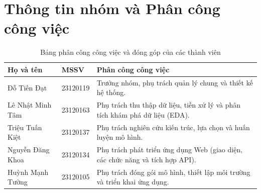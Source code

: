 \section*{Thông tin nhóm và Phân công công việc}

\begin{table}[H]
\centering
\begin{tabularx}{\textwidth}{llX}
\toprule
\textbf{Họ và tên} & \textbf{MSSV} & \textbf{Phân công công việc} \\ \midrule
Đỗ Tiến Đạt & 23120119 & Trưởng nhóm, phụ trách quản lý chung và thiết kế hệ thống. \\ \addlinespace
Lê Nhật Minh Tâm & 23120163 & Phụ trách thu thập dữ liệu, tiền xử lý và phân tích khám phá dữ liệu (EDA). \\ \addlinespace
Triệu Tuấn Kiệt & 23120137 & Phụ trách nghiên cứu kiến trúc, lựa chọn và huấn luyện mô hình. \\ \addlinespace
Nguyễn Đăng Khoa & 23120134 & Phụ trách phát triển ứng dụng Web (giao diện, các chức năng và tích hợp API). \\ \addlinespace
Huỳnh Mạnh Tường & 23120105 & Phụ trách đóng gói mô hình, thiết lập môi trường và triển khai ứng dụng. \\ \bottomrule
\end{tabularx}
\caption{Bảng phân công công việc và đóng góp của các thành viên}
\label{tab:phan_cong_cong_viec}
\end{table}
